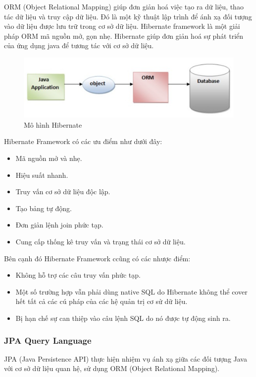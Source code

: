 ORM (Object Relational Mapping) giúp đơn giản hoá việc tạo ra dữ liệu, thao tác dữ liệu và truy cập dữ liệu. Đó là một kỹ thuật lập trình để ánh xạ đối tượng vào dữ liệu được lưu trữ trong cơ sở dữ liệu. Hibernate framework là một giải pháp ORM mã nguồn mở, gọn nhẹ. Hibernate giúp đơn giản hoá sự phát triển của ứng dụng java để tương tác với cơ sở dữ liệu.\\
 \begin{figure}[h!]
    \begin{center}
        \includegraphics[width=15cm]{Image/Technical/hibernate_module.png}
        \caption{Mô hình Hibernate}
        \label{spring}
    \end{center}
\end{figure}

Hibernate Framework có các ưu điểm như dưới đây:
\begin{itemize}
    \item Mã nguồn mở và nhẹ.
    \item Hiệu suất nhanh.
    \item Truy vấn cơ sở dữ liệu độc lập.
    \item Tạo bảng tự động.
    \item Đơn giản lệnh join phức tạp.
    \item Cung cấp thống kê truy vấn và trạng thái cơ sở dữ liệu.
\end{itemize}
Bên cạnh đó Hibernate Framework ccũng có các nhược điểm:
\begin{itemize}
    \item Không hỗ trợ các câu truy vấn phức tạp.
    \item Một số trường hợp vẫn phải dùng native SQL do Hibernate không thể cover hết tất cả các cú pháp của các hệ quản trị cơ sử dữ liệu.
    \item Bị hạn chế sự can thiệp vào câu lệnh SQL do nó được tự động sinh ra.
\end{itemize}

\subsubsection{JPA Query Language}
JPA (Java Persistence API) thực hiện nhiệm vụ ánh xạ giữa các đối tượng Java với cơ sở dữ liệu quan hệ, sử dụng ORM (Object Relational Mapping).\par

